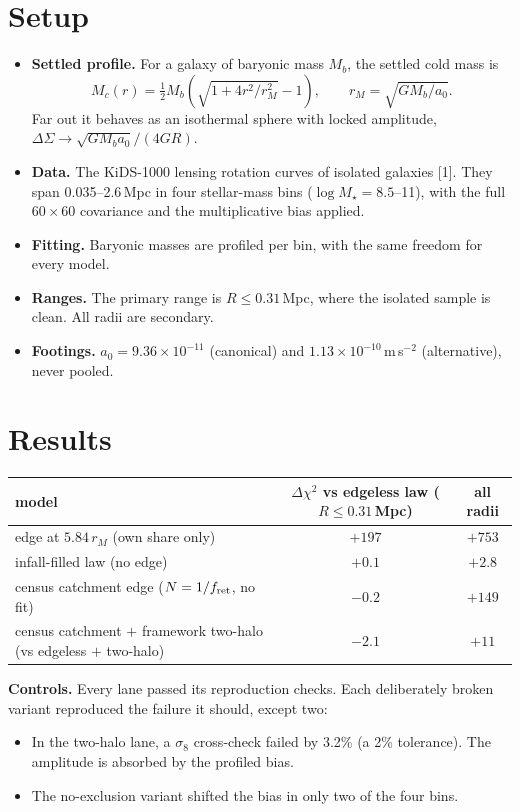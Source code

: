 \documentclass[10pt]{article}
\begin{document}
\section{Setup}
\begin{itemize}
\item \textbf{Settled profile.} For a galaxy of baryonic mass $M_b$, the settled cold mass is
$$M_c(r)=\tfrac12M_b\left(\sqrt{1+4r^2/r_M^2}-1\right),\qquad r_M=\sqrt{GM_b/a_0}.$$
Far out it behaves as an isothermal sphere with locked amplitude, $\Delta\Sigma\to\sqrt{GM_ba_0}/(4GR)$.
\item \textbf{Data.} The KiDS-1000 lensing rotation curves of isolated galaxies [1]. They span 0.035--2.6\,Mpc in four stellar-mass bins ($\log M_\star=8.5$--11), with the full $60\times60$ covariance and the multiplicative bias applied.
\item \textbf{Fitting.} Baryonic masses are profiled per bin, with the same freedom for every model.
\item \textbf{Ranges.} The primary range is $R\le0.31$\,Mpc, where the isolated sample is clean. All radii are secondary.
\item \textbf{Footings.} $a_0=9.36\times10^{-11}$ (canonical) and $1.13\times10^{-10}$\,m\,s$^{-2}$ (alternative), never pooled.
\end{itemize}

\section{Results}
\begin{center}
\begin{tabular}{lcc}
\toprule
model & $\Delta\chi^2$ vs edgeless law ($R\le0.31$\,Mpc) & all radii\\
\midrule
edge at $5.84\,r_M$ (own share only) & $+197$ & $+753$\\
infall-filled law (no edge) & $+0.1$ & $+2.8$\\
census catchment edge ($N=1/f_{\rm ret}$, no fit) & $-0.2$ & $+149$\\
census catchment $+$ framework two-halo (vs edgeless $+$ two-halo) & $-2.1$ & $+11$\\
\bottomrule
\end{tabular}
\end{center}

\textbf{Controls.} Every lane passed its reproduction checks. Each deliberately broken variant reproduced the failure it should, except two:
\begin{itemize}
\item In the two-halo lane, a $\sigma_8$ cross-check failed by 3.2\% (a 2\% tolerance). The amplitude is absorbed by the profiled bias.
\item The no-exclusion variant shifted the bias in only two of the four bins.
\end{itemize}
\end{document}

